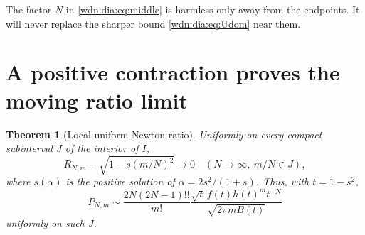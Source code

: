 \documentclass[11pt,letterpaper]{article}
\newtheorem{theorem}{Theorem}[section]
\theoremstyle{remark}\newtheorem{remark}[theorem]{Remark}
\begin{document}
The factor $N$ in \eqref{wdn:dia:eq:middle} is harmless only away from the endpoints.
It will never replace the sharper bound \eqref{wdn:dia:eq:Udom} near them.

\section{A positive contraction proves the moving ratio limit}\label{wdn:dia:sec:contract}
\begin{theorem}[Local uniform Newton ratio]\label{wdn:dia:thm:uniform}
Uniformly on every compact subinterval $J$ of the interior of $I$,
\begin{equation}\label{wdn:dia:eq:Rlimit}
 R_{N,m}-\sqrt{1-s(m/N)^2}\longrightarrow0
 \quad(N\to\infty,\ m/N\in J),
\end{equation}
where $s(\alpha)$ is the positive solution of
$\alpha=2s^2/(1+s)$. Thus, with $t=1-s^2$,
\begin{equation}\label{wdn:dia:eq:uniformP}
 P_{N,m}\sim
 \frac{2N(2N-1)!!}{m!}
 \frac{\sqrt t\,f(t)h(t)^mt^{-N}}{\sqrt{2\pi mB(t)}}
\end{equation}
uniformly on such $J$.
\end{theorem}
\end{document}

